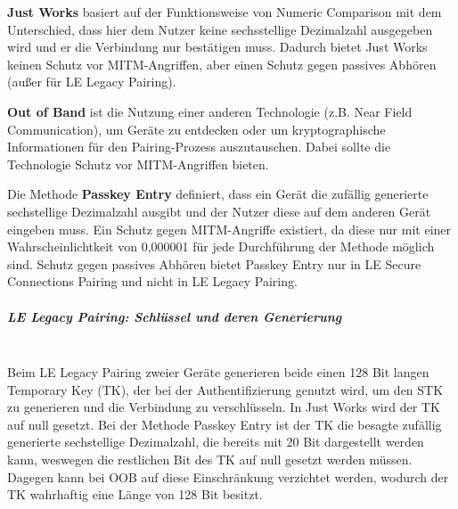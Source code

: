 \textbf{Just Works} basiert auf der Funktionsweise von Numeric Comparison mit dem Unterschied, dass hier dem Nutzer keine sechsstellige Dezimalzahl ausgegeben wird und er die Verbindung nur bestätigen muss. Dadurch bietet Just Works keinen Schutz vor MITM-Angriffen, aber einen Schutz gegen passives Abhören (außer für LE Legacy Pairing). \cite{BtSpec4.2_245}

\textbf{Out of Band} ist die Nutzung einer anderen Technologie (z.B. Near Field Communication), um Geräte zu entdecken oder um kryptographische Informationen für den Pairing-Prozess auszutauschen. Dabei sollte die Technologie Schutz vor MITM-Angriffen bieten. \cite{BtSpec4.2_246}

Die Methode \textbf{Passkey Entry} definiert, dass ein Gerät die zufällig generierte sechstellige Dezimalzahl ausgibt und der Nutzer diese auf dem anderen Gerät eingeben muss. Ein Schutz gegen MITM-Angriffe existiert, da diese nur mit einer Wahrscheinlichtkeit von 0,000001 für jede Durchführung der Methode möglich sind. Schutz gegen passives Abhören bietet Passkey Entry nur in LE Secure Connections Pairing und nicht in LE Legacy Pairing. \cite{BtSpec4.2_246-247} \cite{BtSpec4.2_2304}


\subparagraph{LE Legacy Pairing: Schlüssel und deren Generierung} \mbox{} \vspace{0.2cm} \\

Beim LE Legacy Pairing zweier Geräte generieren beide einen 128 Bit langen Temporary Key (TK), der bei der Authentifizierung genutzt wird, um den STK zu generieren und die Verbindung zu verschlüsseln. In Just Works wird der TK auf null gesetzt. Bei der Methode Passkey Entry ist der TK die besagte zufällig generierte sechstellige Dezimalzahl, die bereits mit 20 Bit dargestellt werden kann, weswegen die restlichen Bit des TK auf null gesetzt werden müssen. Dagegen kann bei OOB auf diese Einschränkung verzichtet werden, wodurch der TK wahrhaftig eine Länge von 128 Bit besitzt.

